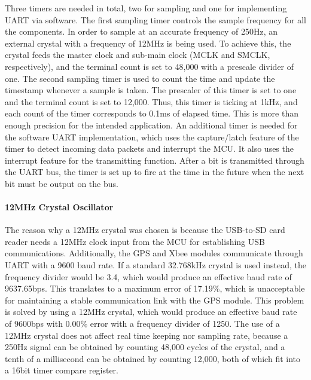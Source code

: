 Three timers are needed in total, two for sampling and one for implementing UART via software. The first sampling timer controls the sample frequency for all the components.  In order to sample at an accurate frequency of 250Hz, an external crystal with a frequency of 12MHz is being used. To achieve this, the crystal feeds the master clock and sub-main clock (MCLK and SMCLK, respectively), and the terminal count is set to 48,000 with a prescale divider of one. The second sampling timer is used to count the time and update the timestamp whenever a sample is taken. The prescaler of this timer is set to one and the terminal count is set to 12,000. Thus, this timer is ticking at 1kHz, and each count of the timer corresponds to 0.1ms of elapsed time. This is more than enough precision for the intended application. An additional timer is needed for the software UART implementation, which uses the capture/latch feature of the timer to detect incoming data packets and interrupt the MCU. It also uses the interrupt feature for the transmitting function. After a bit is transmitted through the UART bus, the timer is set up to fire at the time in the future when the next bit must be output on the bus.

\paragraph{12MHz Crystal Oscillator}
The reason why a 12MHz crystal was chosen is because the USB-to-SD card reader needs a 12MHz clock input from the MCU for establishing USB communications. Additionally, the GPS and Xbee modules communicate through UART with a 9600 baud rate. If a standard 32.768kHz crystal is used instead, the frequency divider would be 3.4, which would produce an effective baud rate of 9637.65bps. This translates to a maximum error of 17.19\%, which is unacceptable for maintaining a stable communication link with the GPS module. This problem is solved by using a 12MHz crystal, which would produce an effective baud rate of 9600bps with 0.00\% error with a frequency divider of 1250. The use of a 12MHz crystal does not affect real time keeping nor sampling rate, because a 250Hz signal can be obtained by counting 48,000 cycles of the crystal, and a tenth of a millisecond can be obtained by counting 12,000, both of which fit into a 16bit timer compare register. 

